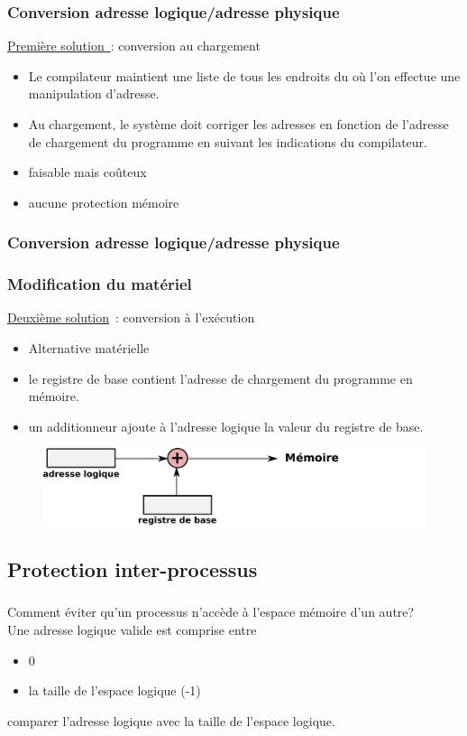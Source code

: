 \begin{frame}
  \frametitle{Conversion adresse logique/adresse physique}
  
  \underline{Première solution~}: conversion au chargement
\begin{itemize}
\item Le compilateur maintient une liste de tous les endroits du
  où l'on effectue une manipulation d'adresse. 
\item Au chargement, le système doit corriger les adresses en fonction de
  l'adresse de chargement du programme en suivant les indications du compilateur.   
\end{itemize}
\begin{itemize}
\item[\ding{212}] faisable mais coûteux
\item[\ding{212}] aucune protection mémoire 
\end{itemize}
 
\end{frame}

\begin{frame}
  \frametitle{Conversion adresse logique/adresse physique}
  \frametitle{Modification du matériel}
  \underline{Deuxième solution}~: conversion à l'exécution
  \begin{itemize}
  \item[\ding{212}] \alert{Alternative matérielle}
  \item le \alert{registre de base} contient l'adresse de chargement du programme en
    mémoire.
  \item un \alert{additionneur} ajoute à l'adresse logique la valeur du registre de
    base.  
  \end{itemize}
  \begin{figure}
    \includegraphics[width=\textwidth]{fig2/conv-log-phys}
  \end{figure}
\end{frame}

\subsection{Protection inter-processus}

\begin{frame}
\frametitle{\insertsubsection}
Comment éviter qu'un processus n'accède à l'espace mémoire d'un autre? \\
\vspace{0.5cm}
\pause
Une adresse logique \alert{valide} est comprise entre
\begin{itemize}
\item 0
\item la taille de l'espace logique (-1)
\end{itemize}
 comparer l'adresse logique avec la taille de l'espace logique. 
\end{frame}

